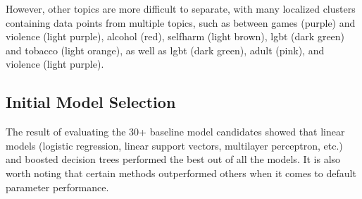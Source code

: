 \documentclass[
  titlepage]{article}
\begin{document}
\begin{figure}
\begin{minipage}{\linewidth}
\begin{figure}[H]
{}


\end{figure}%

\end{minipage}%

\end{figure}%

However, other topics are more difficult to separate, with many
localized clusters containing data points from multiple topics, such as
between games (purple) and violence (light purple), alcohol (red),
selfharm (light brown), lgbt (dark green) and tobacco (light orange), as
well as lgbt (dark green), adult (pink), and violence (light purple).

\subsection{Initial Model Selection}\label{initial-model-selection}

The result of evaluating the 30+ baseline model candidates showed that
linear models (logistic regression, linear support vectors, multilayer
perceptron, etc.) and boosted decision trees performed the best out of
all the models. It is also worth noting that certain methods
outperformed others when it comes to default parameter performance.
\end{document}
